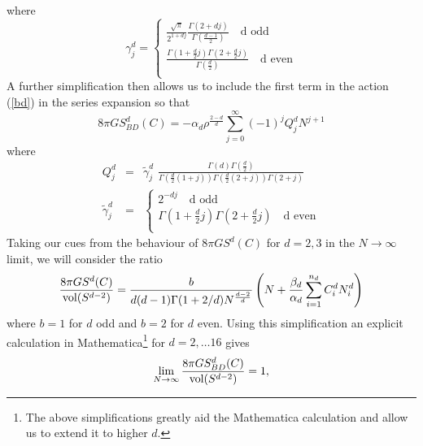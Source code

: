 \documentclass[12pt]{article}
\begin{document}
{\begin{equation}
\label{simplercoefft} 
\end{equation} 
where 
\begin{equation} \gamma_j^d= 
\begin{cases} 
\frac{\sqrt{\pi}}{2^{1+dj} }\frac{\Gamma(2+dj)}{\Gamma(\frac{d-1}{2})}    \quad   \mathrm{d} \, \, \mathrm{odd} \\
\frac{\Gamma(1+\frac{d}{2}j)  \Gamma(2+\frac{d}{2}j) }{\Gamma(\frac{d}{2})}  \quad   \mathrm{d \, \,  even} \\
\end{cases} 
\end{equation} 
A further simplification then allows us to include the first term in the action (\ref{bd}) in the series expansion so that 
\begin{equation} 
8 \pi G S_{BD}^d(C) = -\alpha_d \rho^{\frac{2-d}{d}} \sum_{j=0}^\infty (-1)^j Q_j^d N^{j+1} 
\end{equation}
where 
\begin{eqnarray} 
Q_j^d & =& {\widetilde \gamma}_j^d \, \, \frac{\Gamma(d)\Gamma(\frac{d}{2})}{\Gamma(\frac{d}{2}(1+j)) \Gamma(\frac{d}{2}(2+j)) \Gamma(2+j)} \\ \nonumber 
{\widetilde \gamma}_j^d &=& 
\begin{cases} 
2^{-dj}    \quad   \mathrm{d} \, \, \mathrm{odd} \\
\Gamma(1+\frac{d}{2}j) \Gamma(2+\frac{d}{2}j)   \quad   \mathrm{d \, \,  even} \\
\end{cases} 
\label{fullcoefft} 
\end{eqnarray} 
Taking our cues from the behaviour of $8 \pi G S^d(C)$ for $d=2,3$ in the  $N \rightarrow \infty$ limit,  we will consider the ratio
\begin{equation} 
\frac{ 8 \pi G S^d(C)}{\mathrm{vol}(S^{d-2})} = \frac{b}{d(d-1) \Gamma(1+2/d) N^{\frac{d-2}{d}}} \left( N + \frac{\beta_d}{\alpha_d} \sum_{i=1}^{n_d} C_i^d N_i^d \right)  
\label{ratio} 
\end{equation} 
where $b=1$ for $d$ odd and $b=2$ for $d$ even.
Using this simplification an explicit calculation in Mathematica\footnote{The above simplifications greatly aid the Mathematica calculation and allow us to extend it to higher $d$.}  for $d=2, \ldots 16$ gives 
\begin{equation} 
\lim_{N \rightarrow \infty} \frac{ 8 \pi G S_{BD}^d(C)}{\mathrm{vol}(S^{d-2})} = 1,  
\label{result} 
\end{equation} 

}
\end{document}
